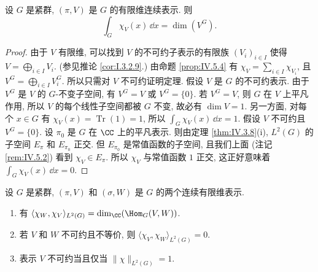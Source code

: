 \begin{theorem}[特征标的积分]
\label{thm:IV.5.7}
设 $G$ 是紧群, $(\pi, V)$ 是 $G$ 的有限维连续表示. 则
\[
\int_G \chi_V(x)\,\dd x = \dim(V^G).
\]
\end{theorem}

\begin{proof}
由于 $V$ 有限维, 可以找到 $V$ 的不可约子表示的有限族 $(V_i)_{i \in I}$ 使得 $V = \bigoplus_{i \in I}V_i$. (参见推论 \ref{cor:I.3.2.9}.) 由命题 \ref{prop:IV.5.4} 有 $\chi_V = \sum_{i \in I}\chi_{V_i}$, 且 $V^G = \bigoplus_{i \in I}V_i^G$. 所以只需对 $V$ 不可约证明定理.
假设 $V$ 是 $G$ 的不可约表示. 由于 $V^G$ 是 $V$ 的 $G$-不变子空间, 有 $V^G = V$ 或 $V^G = \{0\}$. 若 $V^G = V$, 则 $G$ 在 $V$ 上平凡作用, 所以 $V$ 的每个线性子空间都被 $G$ 不变, 故必有 $\dim V = 1$. 另一方面, 对每个 $x \in G$ 有 $\chi_V(x) = \operatorname{Tr}(1) = 1$, 所以 $\int_G\chi_V(x)\,\dd x = 1$. 假设 $V$ 不可约且 $V^G = \{0\}$. 设 $\pi_0$ 是 $G$ 在 $\CC$ 上的平凡表示. 则由定理 \ref{thm:IV.3.8}(i), $L^2(G)$ 的子空间 $E_{\pi}$ 和 $E_{\pi_0}$ 正交. 但 $E_{\pi_0}$ 是常值函数的子空间, 且我们上面 (注记 \ref{rem:IV.5.2}) 看到 $\chi_V \in E_{\pi}$. 所以 $\chi_V$ 与常值函数 $1$ 正交, 这正好意味着 $\int_G\chi_V(x)\,\dd x = 0$.
\end{proof}

\begin{corollary}[特征标的内积]
\label{cor:IV.5.8}
设 $G$ 是紧群, $(\pi, V)$ 和 $(\sigma, W)$ 是 $G$ 的两个连续有限维表示.
\begin{enumerate}
\item[(i)] 有 $\langle \chi_W, \chi_V \rangle_{L^2(G)} = \dim_{\CC}(\Hom_G(V, W))$.
\item[(ii)] 若 $V$ 和 $W$ 不可约且不等价, 则 $\langle \chi_V, \chi_W \rangle_{L^2(G)} = 0$.
\item[(iii)] 表示 $V$ 不可约当且仅当 $\|\chi\|_{L^2(G)} = 1$.
\end{enumerate}
\end{corollary}

